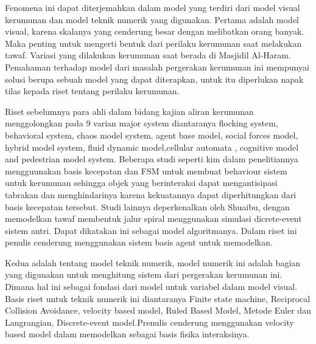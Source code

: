 \hspace{0.6cm}Fenomena ini dapat diterjemahkan dalam model yang terdiri dari model visual kerumunan dan model teknik numerik yang digunakan. Pertama adalah model visual, karena skalanya yang cenderung besar dengan melibatkan orang banyak. Maka penting untuk mengerti bentuk dari perilaku kerumunan saat melakukan tawaf. Variasi yang dilakukan kerumunan saat berada di Masjidil Al-Haram. Pemahaman terhadap model dari masalah pergerakan kerumunan ini mempunyai solusi berupa sebuah model yang dapat diterapkan, untuk itu diperlukan napak tilas kepada riset tentang perilaku kerumunan. 

\hspace{0.6cm}Riset sebelumnya para ahli dalam bidang kajian aliran kerumunan menggolongkan pada 9 varian major system diantaranya flocking system, behavioral system, chaos model system\citep{Saiwaki1997}, agent base model\citep{Khan2012}, social forces model\citep{Zainuddin2009}, hybrid model system\citep{Shuaibu2015}, fluid dynamic model\citep{Narain2009},cellular automata \citep{Lim2012}, cognitive model\citep{Mulyana2010} and pedestrian model system\citep{Adnan2013}. Beberapa studi seperti kim dalam penelitiannya mengguunakan basis kecepatan dan FSM untuk membuat behaviour sistem untuk kerumunan sehingga objek yang berinteraksi dapat mengantisipasi tabrakan dan menghindarinya karena kekuatannya dapat diperhitungkan dari basis kecepatan tersebut\citep{Kim2014}. Studi lainnya deperkenalkan oleh Shuaibu, dengan memodelkan tawaf membentuk jalur spiral menggunakan simulasi dicrete-event sistem antri\citep{Shuaibu2015}. Dapat dikatakan ini sebagai model algoritmanya. Dalam riset ini penulis cenderung menggunakan sistem basis agent untuk memodelkan.

\hspace{0.6cm}Kedua adalah tentang model teknik numerik, model numerik ini adalah bagian yang digunakan untuk menghitung sistem dari pergerakan kerumunan ini. 
Dimana hal ini sebagai fondasi dari model untuk variabel dalam model visual. Basis riset untuk teknik numerik ini diantaranya Finite state machine\citep{Curtis2011}\citep{Bicho2012},  Reciprocal Collision Avoidance, velocity based model\citep{Kim2014}, Ruled Based Model, Metode Euler dan Langrangian\citep{Narain2009}, Discrete-event model.Prenulis cenderung menggunakan velocity based model dalam memodelkan sebagai basis fisika interaksinya. %

